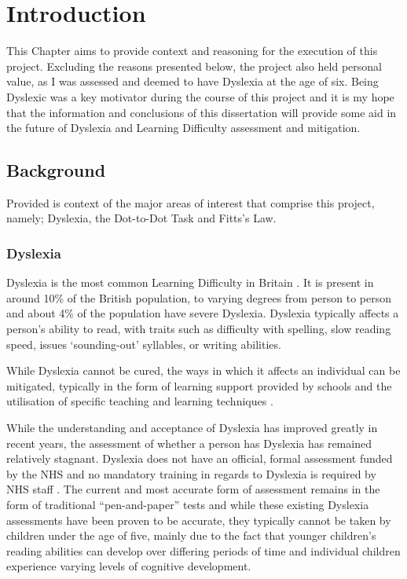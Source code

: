 \section{Introduction}
	This Chapter aims to provide context and reasoning for the execution of this project. Excluding the reasons presented below, the project also held personal value, as I was assessed and deemed to have Dyslexia at the age of six. Being Dyslexic was a key motivator during the course of this project and it is my hope that the information and conclusions of this dissertation will provide some aid in the future of Dyslexia and Learning Difficulty assessment and mitigation.
	\subsection{Background}
		Provided is context of the major areas of interest that comprise this project, namely; Dyslexia, the Dot-to-Dot Task and Fitts's Law.
		\subsubsection{Dyslexia}
			Dyslexia is the most common Learning Difficulty in Britain \cite{BritishDyslexiaAssociation, NHSChoices}. It is present in around 10\% of the British population, to varying degrees from person to person and about 4\% of the population have severe Dyslexia. Dyslexia typically affects a person's ability to read, with traits such as difficulty with spelling, slow reading speed, issues ‘sounding-out’ syllables, or writing abilities.
			
			While Dyslexia cannot be cured, the ways in which it affects an individual can be mitigated, typically in the form of learning support provided by schools and the utilisation of specific teaching and learning techniques \cite{BritishDyslexiaAssociation2016}.
			
			While the understanding and acceptance of Dyslexia has improved greatly in recent years, the assessment of whether a person has Dyslexia has remained relatively stagnant. Dyslexia does not have an official, formal assessment funded by the NHS and no mandatory training in regards to Dyslexia is required by NHS staff \cite{NHSChoicesa} . The current and most accurate form of assessment remains in the form of traditional “pen-and-paper” tests and while these existing Dyslexia assessments have been proven to be accurate, they typically cannot be taken by children under the age of five, mainly due to the fact that younger children’s reading abilities can develop over differing periods of time and individual children experience varying levels of cognitive development.
			

